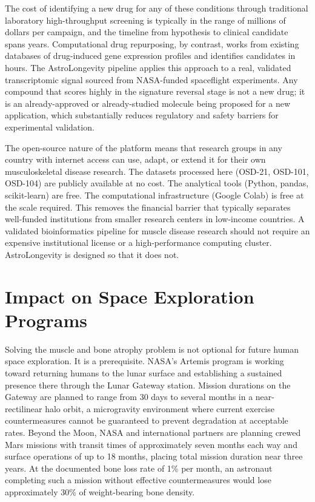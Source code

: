 \documentclass[conference]{IEEEtran}
\begin{document}
The cost of identifying a new drug for any of these conditions through traditional laboratory high-throughput screening is typically in the range of millions of dollars per campaign, and the timeline from hypothesis to clinical candidate spans years. Computational drug repurposing, by contrast, works from existing databases of drug-induced gene expression profiles and identifies candidates in hours. The AstroLongevity pipeline applies this approach to a real, validated transcriptomic signal sourced from NASA-funded spaceflight experiments. Any compound that scores highly in the signature reversal stage is not a new drug; it is an already-approved or already-studied molecule being proposed for a new application, which substantially reduces regulatory and safety barriers for experimental validation.

The open-source nature of the platform means that research groups in any country with internet access can use, adapt, or extend it for their own musculoskeletal disease research. The datasets processed here (OSD-21, OSD-101, OSD-104) are publicly available at no cost. The analytical tools (Python, pandas, scikit-learn) are free. The computational infrastructure (Google Colab) is free at the scale required. This removes the financial barrier that typically separates well-funded institutions from smaller research centers in low-income countries. A validated bioinformatics pipeline for muscle disease research should not require an expensive institutional license or a high-performance computing cluster. AstroLongevity is designed so that it does not.

\section{Impact on Space Exploration Programs}

Solving the muscle and bone atrophy problem is not optional for future human space exploration. It is a prerequisite. NASA's Artemis program is working toward returning humans to the lunar surface and establishing a sustained presence there through the Lunar Gateway station. Mission durations on the Gateway are planned to range from 30 days to several months in a near-rectilinear halo orbit, a microgravity environment where current exercise countermeasures cannot be guaranteed to prevent degradation at acceptable rates. Beyond the Moon, NASA and international partners are planning crewed Mars missions with transit times of approximately seven months each way and surface operations of up to 18 months, placing total mission duration near three years. At the documented bone loss rate of 1\% per month, an astronaut completing such a mission without effective countermeasures would lose approximately 30\% of weight-bearing bone density.
\end{document}

